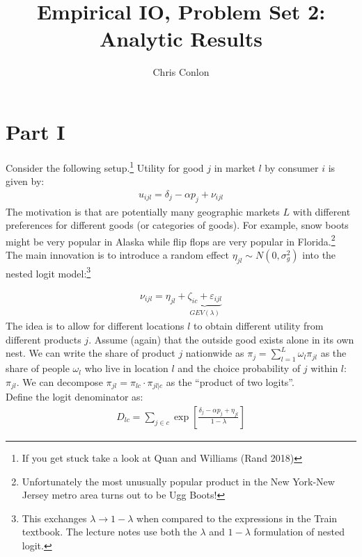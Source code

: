 \documentclass[12pt]{article}
\begin{document}
\title{Empirical IO, Problem Set 2: \\
Analytic Results}
\author{Chris Conlon}
\date{}
\maketitle

\section*{\normalsize Part I}
Consider the following setup.\footnote{If you get stuck take a look at Quan and Williams (Rand 2018)} Utility for good $j$ in market $l$ by consumer $i$ is given by:
\begin{eqnarray*}
u_{ijl} = \delta_j - \alpha p_j + \nu_{ijl}
\end{eqnarray*}
The motivation is that are potentially many geographic markets $L$ with different preferences for different goods (or categories of goods). For example, snow boots might be very popular in Alaska while flip flops are very popular in Florida.\footnote{Unfortunately the most unusually popular product in the New York-New Jersey metro area turns out to be Ugg Boots!}\\

\noindent The main innovation is to introduce a random effect $\eta_{jl} \sim N(0,\sigma_g^2)$ into the nested logit model:\footnote{This exchanges $\lambda \rightarrow 1-\lambda$ when compared to the expressions in the Train textbook. The lecture notes use both the $\lambda$ and $1-\lambda$ formulation of nested logit.}

\begin{eqnarray*}
\nu_{ijl} = \eta_{jl}+ \underbrace{\zeta_{ic} + \varepsilon_{ijl}}_{GEV(\lambda)}
\end{eqnarray*}
The idea is to allow for different locations $l$ to obtain different utility from different products $j$. Assume (again) that the outside good exists alone in its own nest. We can write the share of product $j$ nationwide as $\pi_j = \sum_{l=1}^L \omega_l \pi_{jl}$ as the share of people $\omega_l$ who live in location $l$ and the choice probability of $j$ within $l$: $\pi_{jl}$. We can decompose $\pi_{jl} =  \pi_{lc} \cdot \pi_{jl|c}$ as the ``product of two logits''.\\

Define the logit denominator as:
\begin{eqnarray*}
D_{lc} = \sum_{j \in c} \exp \left[\frac{\delta_j  -\alpha p_j+ \eta_{jl}}{1-\lambda}\right]
\end{eqnarray*}
\end{document}
